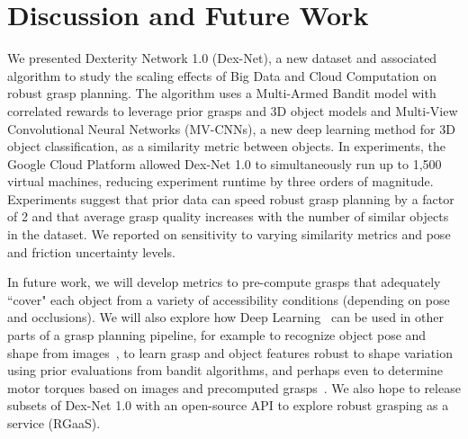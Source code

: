 \section{Discussion and Future Work}
We presented Dexterity Network 1.0 (Dex-Net), a new dataset and associated algorithm to study the scaling effects of Big Data and Cloud Computation on robust grasp planning.
The algorithm uses a Multi-Armed Bandit model with correlated rewards to leverage prior grasps and 3D object models and Multi-View Convolutional Neural Networks (MV-CNNs), a new deep learning method for 3D object classification, as a similarity metric between objects.
In experiments, the Google Cloud Platform allowed Dex-Net 1.0 to simultaneously run up to 1,500 virtual machines, reducing experiment runtime by three orders of magnitude.
Experiments suggest that prior data can speed robust grasp planning by a factor of 2 and that average grasp quality increases with the number of similar objects in the dataset.
We reported on sensitivity to varying similarity metrics and pose and friction uncertainty levels.

In future work, we will develop metrics to pre-compute grasps that adequately ``cover" each object from a variety of accessibility conditions (depending on pose and occlusions).
We will also explore how Deep Learning~\cite{krizhevsky2012imagenet} can be used in other parts of a grasp planning pipeline, for example to recognize object pose and shape from images~\cite{aubry2015understanding}, to learn grasp and object features robust to shape variation using prior evaluations from bandit algorithms, and perhaps even to determine motor torques based on images and precomputed grasps~\cite{levine2015end}.
We also hope to release subsets of Dex-Net 1.0 with an open-source API to explore robust grasping as a service (RGaaS).

